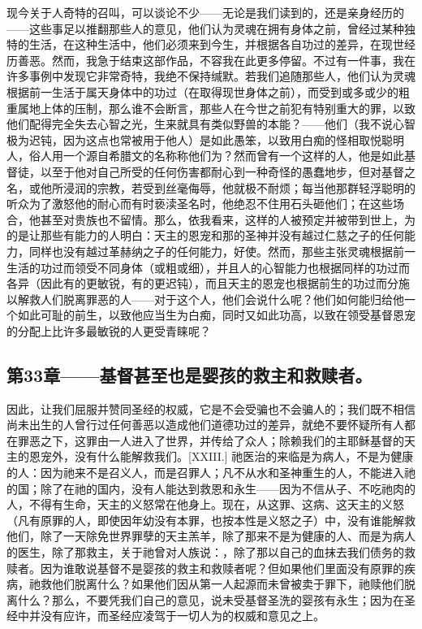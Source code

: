现今关于人奇特的召叫，可以谈论不少——无论是我们读到的，还是亲身经历的——这些事足以推翻那些人的意见，他们认为灵魂在拥有身体之前，曾经过某种独特的生活，在这种生活中，他们必须来到今生，并根据各自功过的差异，在现世经历善恶。然而，我急于结束这部作品，不容我在此更多停留。不过有一件事，我在许多事例中发现它非常奇特，我绝不保持缄默。若我们追随那些人，他们认为灵魂根据前一生活于属天身体中的功过（在取得现世身体之前），而受到或多或少的粗重属地上体的压制，那么谁不会断言，那些人在今世之前犯有特别重大的罪，以致他们配得完全失去心智之光，生来就具有类似野兽的本能？——他们（我不说心智极为迟钝，因为这点也常被用于他人）是如此愚笨，以致用白痴的怪相取悦聪明人，俗人用一个源自希腊文的名称称他们为？然而曾有一个这样的人，他是如此基督徒，以至于他对自己所受的任何伤害都耐心到一种奇怪的愚蠢地步，但对基督之名，或他所浸润的宗教，若受到丝毫侮辱，他就极不耐烦；每当他那群轻浮聪明的听众为了激怒他的耐心而有时亵渎圣名时，他绝忍不住用石头砸他们；在这些场合，他甚至对贵族也不留情。那么，依我看来，这样的人被预定并被带到世上，为的是让那些有能力的人明白：天主的恩宠和那的圣神并没有越过仁慈之子的任何能力，同样也没有越过革赫纳之子的任何能力，好使。然而，那些主张灵魂根据前一生活的功过而领受不同身体（或粗或细），并且人的心智能力也根据同样的功过而各异（因此有的更敏锐，有的更迟钝），而且天主的恩宠也根据前生的功过而分施以解救人们脱离罪恶的人——对于这个人，他们会说什么呢？他们如何能归给他一个如此可耻的前生，以致他应当生为白痴，同时又如此功高，以致在领受基督恩宠的分配上比许多最敏锐的人更受青睐呢？\par


\subsection{第33章——基督甚至也是婴孩的救主和救赎者。}

因此，让我们屈服并赞同圣经的权威，它是不会受骗也不会骗人的；我们既不相信尚未出生的人曾行过任何善恶以造成他们道德功过的差异，就绝不要怀疑所有人都在罪恶之下，这罪由一人进入了世界，并传给了众人；除赖我们的主耶稣基督的天主的恩宠外，没有什么能解救我们。[XXIII.] 祂医治的来临是为病人，不是为健康的人：因为祂来不是召义人，而是召罪人；凡不从水和圣神重生的人，不能进入祂的国；除了在祂的国内，没有人能达到救恩和永生——因为不信从子、不吃祂肉的人，不得有生命，天主的义怒常在他身上。现在，从这罪、这病、这天主的义怒（凡有原罪的人，即使因年幼没有本罪，也按本性是义怒之子）中，没有谁能解救他们，除了一天除免世界罪孽的天主羔羊，除了那来不是为健康的人、而是为病人的医生，除了那救主，关于祂曾对人族说：，除了那以自己的血抹去我们债务的救赎者。因为谁敢说基督不是婴孩的救主和救赎者呢？但如果他们里面没有原罪的疾病，祂救他们脱离什么？如果他们因从第一人起源而未曾被卖于罪下，祂赎他们脱离什么？那么，不要凭我们自己的意见，说未受基督圣洗的婴孩有永生；因为在圣经中并没有应许，而圣经应凌驾于一切人为的权威和意见之上。\par

